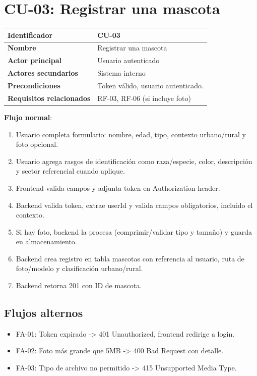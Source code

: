 \documentclass[12pt,a4paper]{article}
\begin{document}
\newpage
\section{CU-03: Registrar una mascota}
\begin{tabular}{|p{3.5cm}|p{10cm}|}
\hline
\textbf{Identificador} & CU-03 \\
\hline
\textbf{Nombre} & Registrar una mascota \\
\hline
\textbf{Actor principal} & Usuario autenticado \\
\hline
\textbf{Actores secundarios} & Sistema interno \\
\hline
\textbf{Precondiciones} & Token v\'alido, usuario autenticado. \\
\hline
\textbf{Requisitos relacionados} & RF-03, RF-06 (si incluye foto) \\
\hline
\end{tabular}

\vspace{0.5em}
\textbf{Flujo normal}:
\begin{enumerate}[leftmargin=*]
    \item Usuario completa formulario: nombre, edad, tipo, contexto urbano/rural y foto opcional.
    \item Usuario agrega rasgos de identificaci\'on como raza/especie, color, descripci\'on y sector referencial cuando aplique.
    \item Frontend valida campos y adjunta token en Authorization header.
    \item Backend valida token, extrae userId y valida campos obligatorios, incluido el contexto.
    \item Si hay foto, backend la procesa (comprimir/validar tipo y tama\~no) y guarda en almacenamiento.
    \item Backend crea registro en tabla mascotas con referencia al usuario, ruta de foto/modelo y clasificaci\'on urbano/rural.
    \item Backend retorna 201 con ID de mascota.
\end{enumerate}

\subsection*{Flujos alternos}
\begin{itemize}[leftmargin=*]
    \item FA-01: Token expirado -> 401 Unauthorized, frontend redirige a login.
    \item FA-02: Foto m\'as grande que 5MB -> 400 Bad Request con detalle.
    \item FA-03: Tipo de archivo no permitido -> 415 Unsupported Media Type.
\end{itemize}
\end{document}

